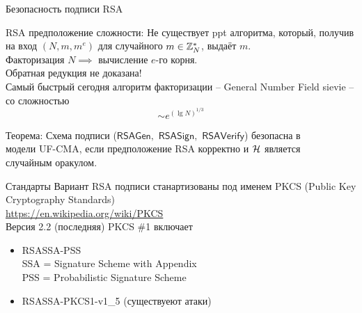 \documentclass[usenames,dvipsnames,8pt,aspectratio=169]{beamer}
\begin{document}
\begin{frame}{Безопасность подписи RSA}
\Large

{\color{Orange}  RSA предположение сложности:}
Не существует ppt алгоритма, который, получив на вход $(N, m, m^e)$ для случайного $m \in {{\mathbb Z}}_N^\ast$, выдаёт $m$.\\[10pt]

{\centering Факторизация $N \implies $ вычисление $e$-го корня. \\[5pt] Обратная редукция не доказана! }  \\[15pt]

Самый быстрый сегодня алгоритм факторизации -- General Number Field sievie -- со сложностью
\[
	\sim e^{(\lg N)^{1/3}}
\]


{\color{Orange}  Теорема:} Схема подписи ($\mathsf{RSAGen},$ $\mathsf{RSASign},$ $\mathsf{RSAVerify}$) безопасна в \\ модели {\color{Orange} UF-CMA}, если {\color{Orange}  предположение RSA корректно} и $\mathcal{H}$ является \\ {\color{Orange}  случайным оракулом.} \\[10pt]
 
\end{frame}

\begin{frame}{Стандарты}
\Large 
Вариант RSA подписи станартизованы под именем PKCS (Public Key Cryptography Standards)   \\
\url{https://en.wikipedia.org/wiki/PKCS} \\[10pt]

Версия 2.2 (последняя)  PKCS \#1 включает \\[10pt]
\begin{itemize}
	\itemsep10pt
	\item RSASSA-PSS \\
	SSA = Signature Scheme with Appendix \\[5pt]
	PSS =  Probabilistic Signature Scheme
	\item  RSASSA-PKCS1-v1\_5 (существуеют атаки)
\end{itemize}

\end{frame}

%
\end{document}
